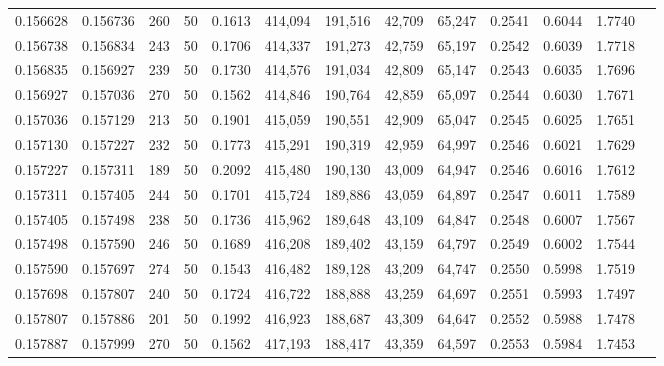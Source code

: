 \begin{tabular}{rrrrrrrrrrrrr}
0.156628 & 0.156736 &   260 &  50 &                                     0.1613 & 414,094 & 191,516 &  42,709 &  65,247 & 0.2541 & 0.6044 & 1.7740 \\
0.156738 & 0.156834 &   243 &  50 &                                     0.1706 & 414,337 & 191,273 &  42,759 &  65,197 & 0.2542 & 0.6039 & 1.7718 \\
0.156835 & 0.156927 &   239 &  50 &                                     0.1730 & 414,576 & 191,034 &  42,809 &  65,147 & 0.2543 & 0.6035 & 1.7696 \\
0.156927 & 0.157036 &   270 &  50 &                                     0.1562 & 414,846 & 190,764 &  42,859 &  65,097 & 0.2544 & 0.6030 & 1.7671 \\
0.157036 & 0.157129 &   213 &  50 &                                     0.1901 & 415,059 & 190,551 &  42,909 &  65,047 & 0.2545 & 0.6025 & 1.7651 \\
0.157130 & 0.157227 &   232 &  50 &                                     0.1773 & 415,291 & 190,319 &  42,959 &  64,997 & 0.2546 & 0.6021 & 1.7629 \\
0.157227 & 0.157311 &   189 &  50 &                                     0.2092 & 415,480 & 190,130 &  43,009 &  64,947 & 0.2546 & 0.6016 & 1.7612 \\
0.157311 & 0.157405 &   244 &  50 &                                     0.1701 & 415,724 & 189,886 &  43,059 &  64,897 & 0.2547 & 0.6011 & 1.7589 \\
0.157405 & 0.157498 &   238 &  50 &                                     0.1736 & 415,962 & 189,648 &  43,109 &  64,847 & 0.2548 & 0.6007 & 1.7567 \\
0.157498 & 0.157590 &   246 &  50 &                                     0.1689 & 416,208 & 189,402 &  43,159 &  64,797 & 0.2549 & 0.6002 & 1.7544 \\
0.157590 & 0.157697 &   274 &  50 &                                     0.1543 & 416,482 & 189,128 &  43,209 &  64,747 & 0.2550 & 0.5998 & 1.7519 \\
0.157698 & 0.157807 &   240 &  50 &                                     0.1724 & 416,722 & 188,888 &  43,259 &  64,697 & 0.2551 & 0.5993 & 1.7497 \\
0.157807 & 0.157886 &   201 &  50 &                                     0.1992 & 416,923 & 188,687 &  43,309 &  64,647 & 0.2552 & 0.5988 & 1.7478 \\
0.157887 & 0.157999 &   270 &  50 &                                     0.1562 & 417,193 & 188,417 &  43,359 &  64,597 & 0.2553 & 0.5984 & 1.7453 \\

\end{tabular}
